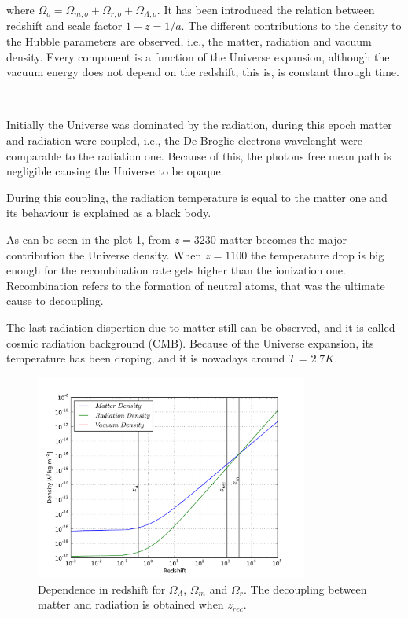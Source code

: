 where $\Omega_o=\Omega_{m,o} +\Omega_{r,o}+\Omega_{\Lambda,o}$. 
It has been introduced the relation between redshift and scale
factor $1+z=1/a$. The different contributions to the density 
to the Hubble parameters are observed, i.e., the matter, radiation
and vacuum density. Every component is a function of the 
Universe expansion, although the vacuum energy does not depend
on the redshift, this is, is constant through time. 

\

Initially the Universe was dominated by the radiation, during 
this epoch matter and radiation were coupled, i.e., the De Broglie 
electrons wavelenght were comparable to the radiation one. Because
of this, the photons free mean path is negligible causing the Universe
to be opaque. 

During this coupling, the radiation temperature is equal to the 
matter one and its behaviour is explained as a black body. 

As can be seen in the plot \ref{densidad}, from $z=3230$
matter becomes the major contribution the Universe density.
When $z=1100$ the temperature drop is big enough for the
recombination rate gets higher than the ionization one. 
Recombination refers to the formation of neutral atoms,
that was the ultimate cause to decoupling. 

The last radiation dispertion due to matter still can be
observed, and it is called cosmic radiation background (CMB).
Because of the Universe expansion, its temperature
has been droping, and it is nowadays around $T$ = $2.7K$. 
  
\begin{figure}[htbp]
       \centering
               \includegraphics[width=0.8\textwidth]{Images/chapter2/density.pdf}
       \caption{ \small Dependence in redshift for $\Omega_\Lambda$, $\Omega_m$ and
       $\Omega_r$. The decoupling between matter and radiation is obtained when 
       $z_{rec}$.
        }
       \label{densidad}
 \end{figure}


